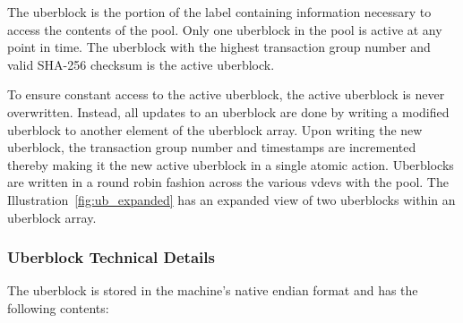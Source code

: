 The uberblock is the portion of the label
containing information necessary to access the contents of the pool.
Only one uberblock in the pool is active at any point in time.
The uberblock with the highest transaction group number and valid SHA-256 checksum
is the active uberblock.

To ensure constant access to the active uberblock,
the active uberblock is never overwritten.
Instead, all updates to an uberblock are done
by writing a modified uberblock to another element of the uberblock array.
Upon writing the new uberblock,
the transaction group number and timestamps are incremented
thereby making it the new active uberblock in a single atomic action.
Uberblocks are written in a round robin fashion across the various vdevs with the pool.
The Illustration~\ref{fig:ub_expanded}
has an expanded view of two uberblocks within an uberblock array.

\subsubsection{Uberblock Technical Details}

The uberblock is stored in the machine's native endian format and has the following contents:

